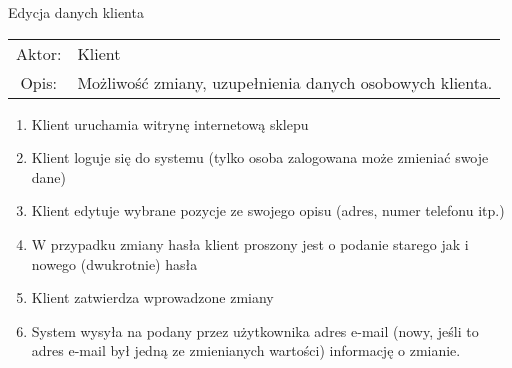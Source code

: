  \item Edycja danych klienta \\
  \begin{tabularx}{\linewidth}{ c X }
  Aktor: & Klient \\
  Opis: & Możliwość zmiany, uzupełnienia danych osobowych klienta.\\
  \end{tabularx}
  \begin{enumerate}
    \item Klient uruchamia witrynę internetową sklepu
    \item Klient loguje się do systemu (tylko osoba zalogowana może zmieniać
    swoje dane)
    \item Klient edytuje wybrane pozycje ze swojego opisu (adres, numer
    telefonu itp.)
    \item W przypadku zmiany hasła klient proszony jest o podanie starego jak i
    nowego (dwukrotnie) hasła
    \item Klient zatwierdza wprowadzone zmiany
    \item System wysyła na podany przez użytkownika adres e-mail (nowy, jeśli
    to adres e-mail był jedną ze zmienianych wartości) informację o zmianie.
  \end{enumerate}